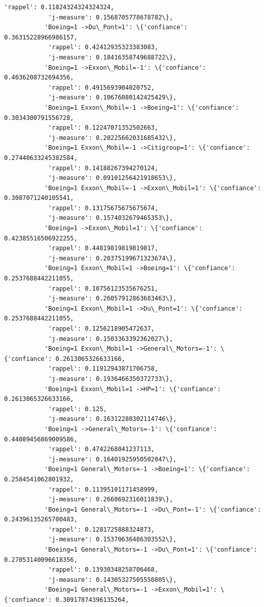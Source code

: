 \documentclass[11pt]{article}
\begin{document}
\begin{Verbatim}[commandchars=\\\{\}]
            'rappel': 0.11824324324324324,
            'j-measure': 0.1568705778678782\},
           'Boeing=1 ->Du\_Pont=1': \{'confiance': 0.36315228966986157,
            'rappel': 0.42412935323383083,
            'j-measure': 0.18416358749688722\},
           'Boeing=1 ->Exxon\_Mobil=-1': \{'confiance': 0.4036208732694356,
            'rappel': 0.4915693904020752,
            'j-measure': 0.10676080142425429\},
           'Boeing=1 Exxon\_Mobil=-1 ->Boeing=1': \{'confiance': 0.3034300791556728,
            'rappel': 0.12247071352502663,
            'j-measure': 0.20225662031685432\},
           'Boeing=1 Exxon\_Mobil=-1 ->Citigroup=1': \{'confiance': 0.27440633245382584,
            'rappel': 0.14188267394270124,
            'j-measure': 0.09101256421918653\},
           'Boeing=1 Exxon\_Mobil=-1 ->Exxon\_Mobil=1': \{'confiance': 0.3087071240105541,
            'rappel': 0.13175675675675674,
            'j-measure': 0.1574032679465353\},
           'Boeing=1 ->Exxon\_Mobil=1': \{'confiance': 0.42385516506922255,
            'rappel': 0.44819819819819817,
            'j-measure': 0.20375199671323674\},
           'Boeing=1 Exxon\_Mobil=1 ->Boeing=1': \{'confiance': 0.2537688442211055,
            'rappel': 0.10756123535676251,
            'j-measure': 0.26057912863683463\},
           'Boeing=1 Exxon\_Mobil=1 ->Du\_Pont=1': \{'confiance': 0.2537688442211055,
            'rappel': 0.1256218905472637,
            'j-measure': 0.1503363392362027\},
           'Boeing=1 Exxon\_Mobil=1 ->General\_Motors=-1': \{'confiance': 0.2613065326633166,
            'rappel': 0.11912943871706758,
            'j-measure': 0.1936466350372733\},
           'Boeing=1 Exxon\_Mobil=1 ->HP=1': \{'confiance': 0.2613065326633166,
            'rappel': 0.125,
            'j-measure': 0.16312280302114746\},
           'Boeing=1 ->General\_Motors=-1': \{'confiance': 0.44089456869009586,
            'rappel': 0.4742268041237113,
            'j-measure': 0.16401925950502047\},
           'Boeing=1 General\_Motors=-1 ->Boeing=1': \{'confiance': 0.2584541062801932,
            'rappel': 0.11395101171458999,
            'j-measure': 0.2660692316011839\},
           'Boeing=1 General\_Motors=-1 ->Du\_Pont=-1': \{'confiance': 0.24396135265700483,
            'rappel': 0.1281725888324873,
            'j-measure': 0.15370636486303552\},
           'Boeing=1 General\_Motors=-1 ->Du\_Pont=1': \{'confiance': 0.27053140096618356,
            'rappel': 0.13930348258706468,
            'j-measure': 0.14305327505550805\},
           'Boeing=1 General\_Motors=-1 ->Exxon\_Mobil=1': \{'confiance': 0.30917874396135264,

\end{Verbatim}
\end{document}
